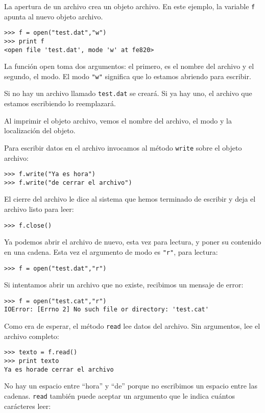 La apertura de un archivo crea un objeto archivo. En este ejemplo, la
variable \texttt{f} apunta al nuevo objeto archivo.

\beforeverb
\begin{verbatim}
>>> f = open("test.dat","w")
>>> print f
<open file 'test.dat', mode 'w' at fe820>
\end{verbatim}
\afterverb
%
La función open toma dos argumentos: el primero, es el nombre del archivo
y el segundo, el modo. El modo {\verb+"w"+} significa que lo estamos abriendo
para escribir.

Si no hay un archivo llamado \texttt{test.dat} se creará. Si ya hay uno, el
archivo que estamos escribiendo lo reemplazará.

Al imprimir el objeto archivo, vemos el nombre del archivo, el
modo y la localización del objeto.

Para escribir datos en el archivo invocamos al método \texttt{write}
sobre el objeto archivo:

\beforeverb
\begin{verbatim}
>>> f.write("Ya es hora")
>>> f.write("de cerrar el archivo")
\end{verbatim}
\afterverb
%
El cierre del archivo le dice al sistema que hemos terminado de
escribir y deja el archivo listo para leer:

\beforeverb
\begin{verbatim}
>>> f.close()
\end{verbatim}
\afterverb
%
Ya podemos abrir el archivo de nuevo, esta vez para lectura, y poner su
contenido en una cadena. Esta vez el argumento de modo es {\verb+"r"+}, para
lectura:

\beforeverb
\begin{verbatim}
>>> f = open("test.dat","r")
\end{verbatim}
\afterverb
%
Si intentamos abrir un archivo que no existe, recibimos un mensaje de error:


\beforeverb
\begin{verbatim}
>>> f = open("test.cat","r")
IOError: [Errno 2] No such file or directory: 'test.cat'
\end{verbatim}
\afterverb
%
Como era de esperar, el método \texttt{read} lee datos del archivo. Sin
argumentos, lee el archivo completo:

\beforeverb
\begin{verbatim}
>>> texto = f.read()
>>> print texto
Ya es horade cerrar el archivo
\end{verbatim}
\afterverb
%
No hay un espacio entre ``hora'' y ``de'' porque no escribimos un espacio
entre las cadenas. \texttt{read} también puede aceptar un argumento que le indica cuántos
carácteres leer:

